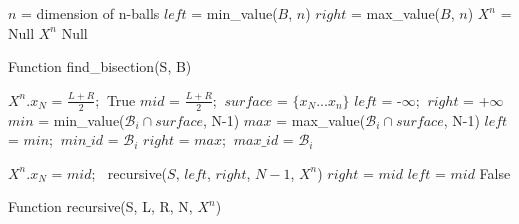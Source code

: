 \begin{algorithm}
\begin{algorithmic}[1]
\Input
\EndInput
\Output
\EndOutput

\State $n$ = dimension of n-balls
\State $left$ = min\_value($B$, $n$) 
\State $right$ = max\_value($B$, $n$) 
\State $X^n$ = Null
    \State \Return $X^n$
\Else
    \State \Return Null
\EndIf
\end{algorithmic}
\caption{Function find\_bisection(S, B)}
\label{algo:find_bisection_function}
\end{algorithm}

\begin{algorithm}
\begin{algorithmic}[1]
\Input
\EndInput
\Output
\EndOutput
{}
    \State $X^n.x_N$ = $\frac{L+R}{2}$; $\ $\Return True
\EndIf
{}
    \State $mid$ = $\frac{L+R}{2}$; $\ surface$ = $\{x_{N}...x_{n}\}$
    \State $left$ = -$\infty$; $\ right$ = +$\infty$
        \State $min$ = min\_value($\mathcal{B}_i \cap surface$, N-1)
        \State $max$ = max\_value($\mathcal{B}_i \cap surface$, N-1)
            \State $left$ = $min$; $\ min\_id$ = $\mathcal{B}_i$
        \EndIf
            \State $right$ = $max$; $\ max\_id$ = $\mathcal{B}_i$
        \EndIf
    \EndFor
    
        \State $X^n.x_N$ = $mid$; $\ $
        \Return recursive($S$, $left$, $right$, $N-1$, $X^n$)
        \State $right$ = $mid$
    \Else
        \State $left$ = $mid$
    \EndIf
\EndWhile
\State \Return False
\end{algorithmic}
\caption{Function recursive(S, L, R, N, $X^n$)}
\label{algo:recursive}
\end{algorithm}
